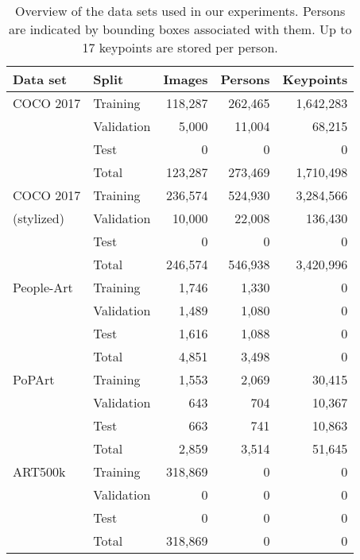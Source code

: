 \documentclass[sigconf]{acmart}
\begin{document}
\begin{table}[]
\caption{Overview of the data sets used in our experiments. Persons are indicated by bounding boxes associated with them. Up to 17 keypoints are stored per person.}
\label{tab:data}

\begin{tabularx}{\columnwidth}{@{}Xlrrr@{}}
\toprule
Data set      & Split        & Images  & Persons & Keypoints \\
\midrule
COCO 2017     & Training     & 118,287 & 262,465 & 1,642,283 \\
              & Validation   & 5,000   & 11,004  & 68,215    \\
              & Test         & 0       & 0       & 0         \\
              \cmidrule{2-5}
              & Total        & 123,287 & 273,469 & 1,710,498 \\
\midrule
COCO 2017     & Training     & 236,574 & 524,930 & 3,284,566 \\
(stylized)    & Validation   & 10,000  & 22,008  & 136,430   \\
              & Test         & 0       & 0       & 0         \\
              \cmidrule{2-5}
              & Total        & 246,574 & 546,938 & 3,420,996 \\
\midrule
People-Art    & Training     & 1,746   & 1,330   & 0         \\
              & Validation   & 1,489   & 1,080   & 0         \\
              & Test         & 1,616   & 1,088   & 0         \\
              \cmidrule{2-5}
              & Total        & 4,851   & 3,498   & 0         \\
\midrule
PoPArt        & Training     & 1,553   & 2,069   & 30,415    \\
              & Validation   & 643     & 704     & 10,367    \\
              & Test         & 663     & 741     & 10,863    \\
              \cmidrule{2-5}
              & Total        & 2,859   & 3,514   & 51,645    \\
\midrule
ART500k       & Training     & 318,869 & 0       & 0         \\
              & Validation   & 0       & 0       & 0         \\
              & Test         & 0       & 0       & 0         \\
              \cmidrule{2-5}
              & Total        & 318,869 & 0       & 0         \\
\bottomrule
\end{tabularx}
\end{table}
\end{document}

